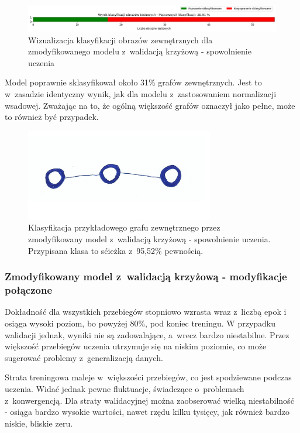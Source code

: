 \begin{figure}[ht]
	\centering
	\includegraphics[width=15.5cm]{resources/tests/images/v4/crossvalid_4_bar.png}
	\caption{Wizualizacja klasyfikacji obrazów zewnętrznych dla zmodyfikowanego modelu z~walidacją krzyżową - spowolnienie uczenia}
	\label{Fig:tests-cv-4c}
\end{figure}
\FloatBarrier

Model poprawnie sklasyfikował około 31\% grafów zewnętrznych.
Jest to w~zasadzie identyczny wynik, jak dla modelu z~zastosowaniem normalizacji wsadowej.
Zważając na to, że ogólną większość grafów oznaczył jako pełne, może to również być przypadek.

\begin{figure}[ht]
	\centering
	\includegraphics[height=4cm]{../graph_classification/test_graphs/drawn/path-10.png}
	\caption{Klasyfikacja przykładowego grafu zewnętrznego przez zmodyfikowany model z~walidacją krzyżową - spowolnienie uczenia.
		Przypisana klasa to sćieżka z~95,52\% pewnością.}
	\label{Fig:tests-cv-4d}
\end{figure}
\FloatBarrier

\subsubsection{Zmodyfikowany model z~walidacją krzyżową - modyfikacje połączone}

Dokładność dla wszystkich przebiegów stopniowo wzrasta wraz z~liczbą epok
i osiąga wysoki poziom, bo powyżej 80\%, pod koniec treningu.
W przypadku walidacji jednak, wyniki nie są zadowalające, a~wrecz bardzo niestabilne.
Przez większość przebiegów uczenia utrzymuje się na niskim poziomie,
co może sugerować problemy z~generalizacją danych.

Strata treningowa maleje w~większości przebiegów, co jest spodziewane podczas uczenia.
Widać jednak pewne fluktuacje, świadczące o~problemach z~konwergencją.
Dla straty walidacyjnej można zaobserować wielką niestabilność - osiąga bardzo wysokie wartości,
nawet rzędu kilku tysięcy, jak również bardzo niskie, bliskie zeru.

